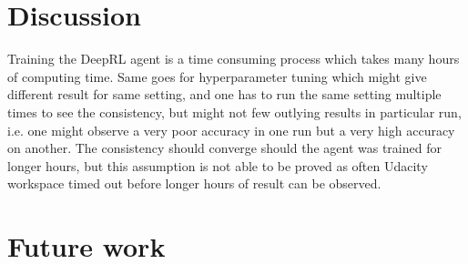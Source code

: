 \documentclass[10pt,journal,compsoc]{IEEEtran}
\begin{document}
\section{Discussion}
Training the DeepRL agent is a time consuming process which takes many hours of computing time. Same goes for hyperparameter tuning which might give different result for same setting, and one has to run the same setting multiple times to see the consistency, but might not few outlying results in particular run, i.e. one might observe a very poor accuracy in one run but a very high accuracy on another.  The consistency should converge should the agent was trained for longer hours, but this assumption is not able to be proved as often Udacity workspace timed out before longer hours of result can be observed.

\section{Future work}
\end{document}
